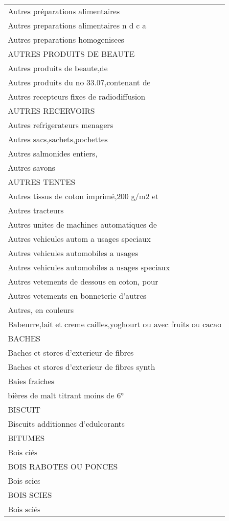 \documentclass[
]{book}
\begin{document}
\begin{longtable}[t]{l}
Autres préparations alimentaires\\
Autres preparations alimentaires n d c a\\
Autres preparations homogenisees\\
AUTRES PRODUITS DE BEAUTE\\
\addlinespace
Autres produits de beaute,de\\
Autres produits du no 33.07,contenant de\\
Autres recepteurs fixes de radiodiffusion\\
AUTRES RECERVOIRS\\
Autres refrigerateurs menagers\\
\addlinespace
Autres sacs,sachets,pochettes\\
Autres salmonides entiers,\\
Autres savons\\
AUTRES TENTES\\
Autres tissus de coton imprimé,200 g/m2 et\\
\addlinespace
Autres tracteurs\\
Autres unites de machines automatiques de\\
Autres vehicules autom a usages speciaux\\
Autres vehicules automobiles a usages\\
Autres vehicules automobiles a usages speciaux\\
\addlinespace
Autres vetements de dessous en coton, pour\\
Autres vetements en bonneterie d'autres\\
Autres, en couleurs\\
Babeurre,lait et creme cailles,yoghourt ou avec fruits ou cacao\\
BACHES\\
\addlinespace
Baches et stores d'exterieur de fibres\\
Baches et stores d'exterieur de fibres synth\\
Baies fraiches\\
bières de malt titrant moins de 6°\\
BISCUIT\\
\addlinespace
Biscuits additionnes d'edulcorants\\
BITUMES\\
Bois ciés\\
BOIS RABOTES OU PONCES\\
Bois scies\\
\addlinespace
BOIS SCIES\\
Bois sciés\\

\end{longtable}
\end{document}

